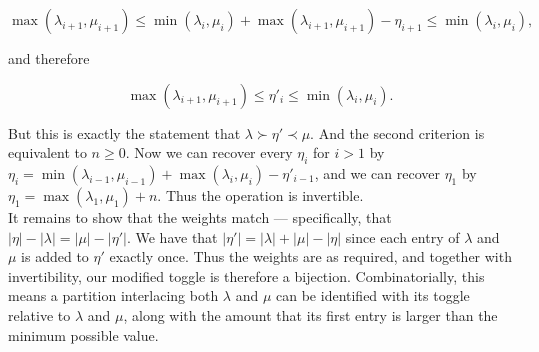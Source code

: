 $$
	\max(\lambda_{i + 1}, \mu_{i + 1}) \leq \min(\lambda_i, \mu_i) + \max(\lambda_{i + 1}, \mu_{i + 1}) - \eta_{i + 1} \leq \min(\lambda_i, \mu_i),
$$

and therefore

$$
	\max(\lambda_{i + 1}, \mu_{i + 1}) \leq \eta'_i \leq \min(\lambda_i, \mu_i).
$$

But this is exactly the statement that $\lambda \succ \eta' \prec \mu$. And the second criterion is equivalent to $n \geq 0$. Now we can recover every $\eta_i$ for $i > 1$ by $\eta_i = \min(\lambda_{i - 1}, \mu_{i - 1}) + \max(\lambda_i, \mu_i) - \eta'_{i - 1}$, and we can recover $\eta_1$ by $\eta_1 = \max(\lambda_1, \mu_1) + n$. Thus the operation is invertible.\\

It remains to show that the weights match --- specifically, that $|\eta| - |\lambda| = |\mu| - |\eta'|$. We have that $|\eta'| = |\lambda| + |\mu| - |\eta|$ since each entry of $\lambda$ and $\mu$ is added to $\eta'$ exactly once. Thus the weights are as required, and together with invertibility, our modified toggle is therefore a bijection. Combinatorially, this means a partition interlacing both $\lambda$ and $\mu$ can be identified with its toggle relative to $\lambda$ and $\mu$, along with the amount that its first entry is larger than the minimum possible value.


